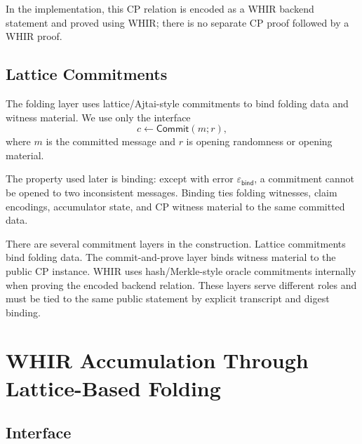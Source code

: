 \documentclass[11pt]{article}
\theoremstyle{definition}
\newcommand{\Commit}{\mathsf{Commit}}
\begin{document}
In the implementation, this CP relation is encoded as a WHIR backend statement
and proved using WHIR; there is no separate CP proof followed by a WHIR proof.

\subsection{Lattice Commitments}
\label{sec:prelim-lattice-commitments}

The folding layer uses lattice/Ajtai-style commitments to bind folding data and
witness material. We use only the interface
\[
  c \leftarrow \Commit(m;r),
\]
where \(m\) is the committed message and \(r\) is opening randomness or opening
material.

The property used later is binding: except with error
\(\varepsilon_{\mathsf{bind}}\), a commitment cannot be opened to two
inconsistent messages. Binding ties folding witnesses, claim encodings,
accumulator state, and CP witness material to the same committed data.

There are several commitment layers in the construction. Lattice commitments
bind folding data. The commit-and-prove layer binds witness material to the
public CP instance. WHIR uses hash/Merkle-style oracle commitments internally
when proving the encoded backend relation. These layers serve different roles
and must be tied to the same public statement by explicit transcript and digest
binding.

\section{WHIR Accumulation Through Lattice-Based Folding}
\label{sec:whir-accumulation-through-lattice-based-folding}

\subsection{Interface}
\label{sec:interface}
\end{document}

